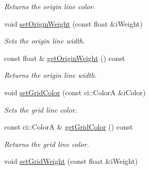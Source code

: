 \begin{DoxyCompactItemize}
\begin{DoxyCompactList}\small\item\em Returns the origin line color. \end{DoxyCompactList}\item 
\hypertarget{class_ui_plot_ae40b2f8d9edc9b0f7619cfdbbebd1ffa}{void \hyperlink{class_ui_plot_ae40b2f8d9edc9b0f7619cfdbbebd1ffa}{set\-Origin\-Weight} (const float \&i\-Weight)}\label{class_ui_plot_ae40b2f8d9edc9b0f7619cfdbbebd1ffa}

\begin{DoxyCompactList}\small\item\em Sets the origin line width. \end{DoxyCompactList}\item 
\hypertarget{class_ui_plot_af4f6b469d6126395cea17182ea9dfe80}{const float \& \hyperlink{class_ui_plot_af4f6b469d6126395cea17182ea9dfe80}{get\-Origin\-Weight} () const }\label{class_ui_plot_af4f6b469d6126395cea17182ea9dfe80}

\begin{DoxyCompactList}\small\item\em Returns the origin line width. \end{DoxyCompactList}\item 
\hypertarget{class_ui_plot_a3c403c69bf8e4a7a7f0d5e64c0e48d12}{void \hyperlink{class_ui_plot_a3c403c69bf8e4a7a7f0d5e64c0e48d12}{set\-Grid\-Color} (const ci\-::\-Color\-A \&i\-Color)}\label{class_ui_plot_a3c403c69bf8e4a7a7f0d5e64c0e48d12}

\begin{DoxyCompactList}\small\item\em Sets the grid line color. \end{DoxyCompactList}\item 
\hypertarget{class_ui_plot_afa1cdb6644a6f0b64d822c250f54052d}{const ci\-::\-Color\-A \& \hyperlink{class_ui_plot_afa1cdb6644a6f0b64d822c250f54052d}{get\-Grid\-Color} () const }\label{class_ui_plot_afa1cdb6644a6f0b64d822c250f54052d}

\begin{DoxyCompactList}\small\item\em Returns the grid line color. \end{DoxyCompactList}\item 
\hypertarget{class_ui_plot_a6dd6203640388a4c3bf0d9aab2c72adb}{void \hyperlink{class_ui_plot_a6dd6203640388a4c3bf0d9aab2c72adb}{set\-Grid\-Weight} (const float \&i\-Weight)}\label{class_ui_plot_a6dd6203640388a4c3bf0d9aab2c72adb}


\end{DoxyCompactItemize}
